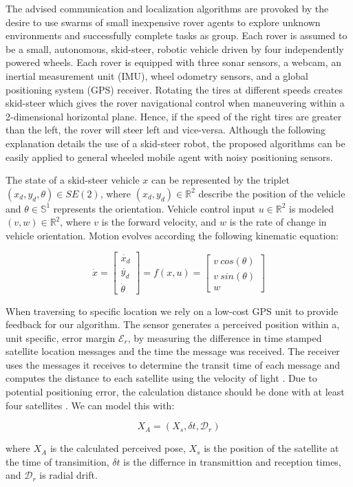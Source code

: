 The advised communication and localization algorithms are provoked by the desire to use swarms of small inexpensive rover agents to explore unknown environments and successfully complete tasks as group. Each rover is assumed to be a small, autonomous, skid-steer, robotic vehicle driven by four independently powered wheels. Each rover is equipped with three sonar sensors, a webcam, an inertial measurement unit (IMU), wheel odometry sensors, and a global positioning system (GPS) receiver. Rotating the tires at different speeds creates skid-steer which gives the rover navigational control when maneuvering within a 2-dimensional horizontal plane. Hence, if the speed of the right tires are greater than the left, the rover will steer left and vice-versa. Although the following explanation details the use of a skid-steer robot, the proposed algorithms can be easily applied to general wheeled mobile agent with noisy positioning sensors.

The state of a skid-steer vehicle $x$ can be represented by the triplet $(x_d, y_d, \theta) \in SE(2)$, where $(x_d, y_d) \in \mathbb{R}^2$ describe the position of the vehicle and $\theta \in \mathbb{S}^1$ represents the orientation. Vehicle control input $u \in \mathbb{R}^2$ is modeled $(v, w) \in \mathbb{R}^2$, where $v$ is the forward velocity, and $w$ is the rate of change in vehicle orientation. Motion evolves according the following kinematic equation:

\begin{equation} \label{skid-steer}
	\dot{x} = 
	\begin{bmatrix}
	\dot{x_d} \\ \dot{y_d} \\ \dot{\theta}
	\end{bmatrix}
	= f(x, u) = 
	\begin{bmatrix}
	v~cos(\theta) \\ v~sin(\theta) \\ w 
	\end{bmatrix}
\end{equation}

When traversing to specific location we rely on a low-cost GPS unit to provide feedback for our algorithm. The sensor generates a perceived position within a, unit specific, error margin $\mathcal{E}_r$, by measuring the difference in time stamped satellite location messages and the time the message was received.  The receiver uses the messages it receives to determine the transit time of each message and computes the distance to each satellite using the velocity of light \cite{rahemi2014accurate}. Due to potential positioning error, the calculation distance should be done with at least four satellites \cite{rahemi2014accurate}. We can model this with:

\begin{equation}
	X_A= (X_s, \delta t, \mathcal{D}_r)
\end{equation}

where $X_A$ is the calculated perceived pose, $X_s$ is the position of the satellite at the time of transimition, $\delta t$ is the differnce in transmittion and reception times, and $\mathcal{D}_r$ is radial drift.